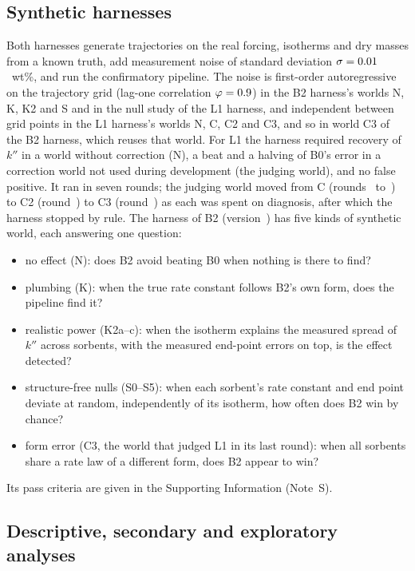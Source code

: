 \documentclass[12pt]{article}
\newcommand{\kpp}{k''}
\begin{document}
\subsection{Synthetic harnesses}

Both harnesses generate trajectories on the real forcing, isotherms and dry masses from a known truth, add
measurement noise of standard deviation $\sigma = \V{sigma}{0.01}$~wt\%, and run the confirmatory pipeline. The noise
is first-order autoregressive on the trajectory grid (lag-one correlation $\varphi = \V{phi}{0.9}$) in the B2 harness's
worlds N, K, K2 and S and in the null study of the L1 harness, and independent between grid points in the L1 harness's
worlds N, C, C2 and C3, and so in world C3 of the B2 harness, which reuses that world. For L1 the harness required recovery of
$\kpp$ in a world without correction (N), a beat and a halving of B0's error in a correction world not used during
development (the judging world), and no false positive. It ran in seven rounds; the judging world moved from C
(rounds~ to~) to C2 (round~) to C3 (round~) as each was spent on diagnosis, after which the
harness stopped by rule. The harness of B2 (version~) has five kinds of synthetic
world, each answering one question:
\begin{itemize}
\item no effect (N): does B2 avoid beating B0 when nothing is there to find?
\item plumbing (K): when the true rate constant follows B2's own form, does the pipeline find it?
\item realistic power (K2a--c): when the isotherm explains the measured spread of $\kpp$ across sorbents, with the
  measured end-point errors on top, is the effect detected?
\item structure-free nulls (S0--S5): when each sorbent's rate constant and end point deviate at random, independently
  of its isotherm, how often does B2 win by chance?
\item form error (C3, the world that judged L1 in its last round): when all sorbents share a rate law of a
  different form, does B2 appear to win?
\end{itemize}
Its pass criteria are given in the Supporting Information (Note~S).

\subsection{Descriptive, secondary and exploratory analyses}
\end{document}
